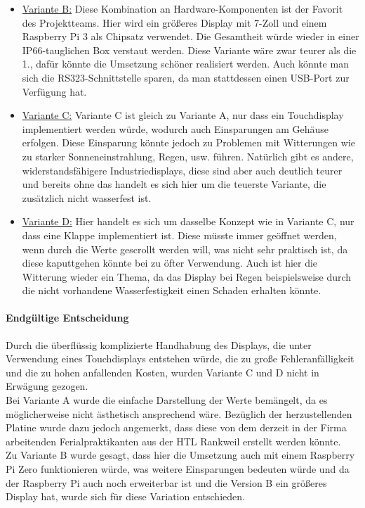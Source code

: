 \begin{itemize}
	\item \underline{Variante B:} Diese Kombination an Hardware-Komponenten ist der Favorit des Projektteams. Hier wird ein größeres Display mit 7-Zoll und einem Raspberry Pi 3 als Chipsatz verwendet. Die Gesamtheit würde wieder in einer IP66-tauglichen Box verstaut werden. Diese Variante wäre zwar teurer als die 1., dafür könnte die Umsetzung schöner realisiert werden. Auch könnte man sich die RS323-Schnittstelle sparen, da man stattdessen einen USB-Port zur Verfügung hat.
	\item \underline{Variante C:} Variante C ist gleich zu Variante A, nur dass ein Touchdisplay implementiert werden würde, wodurch auch Einsparungen am Gehäuse erfolgen. Diese Einsparung könnte jedoch zu Problemen mit Witterungen wie zu starker Sonneneinstrahlung, Regen, usw. führen. Natürlich gibt es andere, widerstandsfähigere Industriedisplays, diese sind aber auch deutlich teurer und bereits ohne das handelt es sich hier um die teuerste Variante, die zusätzlich nicht wasserfest ist.
	\item \underline{Variante D:} Hier handelt es sich um dasselbe Konzept wie in Variante C, nur dass eine Klappe implementiert ist. Diese müsste immer geöffnet werden, wenn durch die Werte gescrollt werden will, was nicht sehr praktisch ist, da diese kaputtgehen könnte bei zu öfter Verwendung. Auch ist hier die Witterung wieder ein Thema, da das Display bei Regen beispielsweise durch die nicht vorhandene Wasserfestigkeit einen Schaden erhalten könnte.
\end{itemize}

\paragraph{Endgültige Entscheidung}
Durch die überflüssig komplizierte Handhabung des Displays, die unter Verwendung eines Touchdisplays entstehen würde, die zu große Fehleranfälligkeit und die zu hohen anfallenden Kosten, wurden Variante C und D nicht in Erwägung gezogen. \\
Bei Variante A wurde die einfache Darstellung der Werte bemängelt, da es möglicherweise nicht ästhetisch ansprechend wäre. Bezüglich der herzustellenden Platine wurde dazu jedoch angemerkt, dass diese von dem derzeit in der Firma arbeitenden Ferialpraktikanten aus der HTL Rankweil erstellt werden könnte. \\
Zu Variante B wurde gesagt, dass hier die Umsetzung auch mit einem Raspberry Pi Zero funktionieren würde, was weitere Einsparungen bedeuten würde und da der Raspberry Pi auch noch erweiterbar ist und die Version B ein größeres Display hat, wurde sich für diese Variation entschieden.
